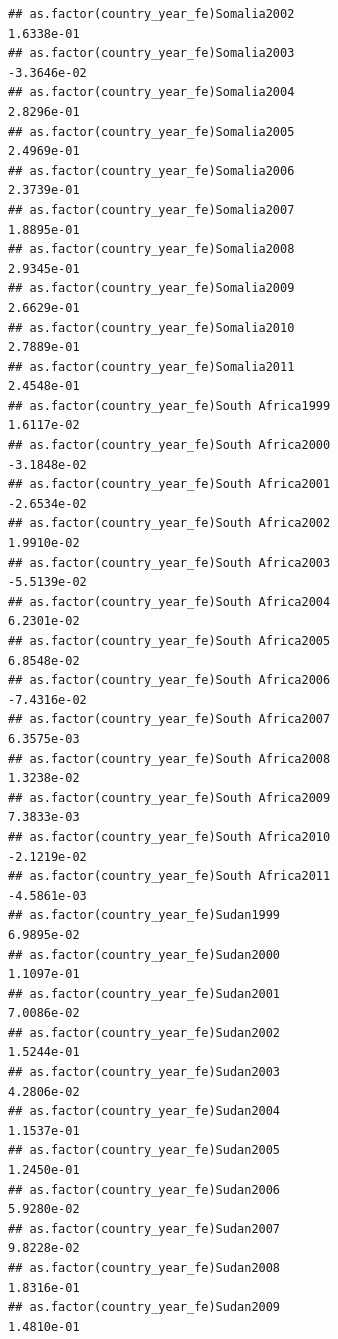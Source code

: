 \documentclass[
  a4paper,
]{article}
\begin{document}
\begin{verbatim}
## as.factor(country_year_fe)Somalia2002                           1.6338e-01
## as.factor(country_year_fe)Somalia2003                          -3.3646e-02
## as.factor(country_year_fe)Somalia2004                           2.8296e-01
## as.factor(country_year_fe)Somalia2005                           2.4969e-01
## as.factor(country_year_fe)Somalia2006                           2.3739e-01
## as.factor(country_year_fe)Somalia2007                           1.8895e-01
## as.factor(country_year_fe)Somalia2008                           2.9345e-01
## as.factor(country_year_fe)Somalia2009                           2.6629e-01
## as.factor(country_year_fe)Somalia2010                           2.7889e-01
## as.factor(country_year_fe)Somalia2011                           2.4548e-01
## as.factor(country_year_fe)South Africa1999                      1.6117e-02
## as.factor(country_year_fe)South Africa2000                     -3.1848e-02
## as.factor(country_year_fe)South Africa2001                     -2.6534e-02
## as.factor(country_year_fe)South Africa2002                      1.9910e-02
## as.factor(country_year_fe)South Africa2003                     -5.5139e-02
## as.factor(country_year_fe)South Africa2004                      6.2301e-02
## as.factor(country_year_fe)South Africa2005                      6.8548e-02
## as.factor(country_year_fe)South Africa2006                     -7.4316e-02
## as.factor(country_year_fe)South Africa2007                      6.3575e-03
## as.factor(country_year_fe)South Africa2008                      1.3238e-02
## as.factor(country_year_fe)South Africa2009                      7.3833e-03
## as.factor(country_year_fe)South Africa2010                     -2.1219e-02
## as.factor(country_year_fe)South Africa2011                     -4.5861e-03
## as.factor(country_year_fe)Sudan1999                             6.9895e-02
## as.factor(country_year_fe)Sudan2000                             1.1097e-01
## as.factor(country_year_fe)Sudan2001                             7.0086e-02
## as.factor(country_year_fe)Sudan2002                             1.5244e-01
## as.factor(country_year_fe)Sudan2003                             4.2806e-02
## as.factor(country_year_fe)Sudan2004                             1.1537e-01
## as.factor(country_year_fe)Sudan2005                             1.2450e-01
## as.factor(country_year_fe)Sudan2006                             5.9280e-02
## as.factor(country_year_fe)Sudan2007                             9.8228e-02
## as.factor(country_year_fe)Sudan2008                             1.8316e-01
## as.factor(country_year_fe)Sudan2009                             1.4810e-01

\end{verbatim}
\end{document}
